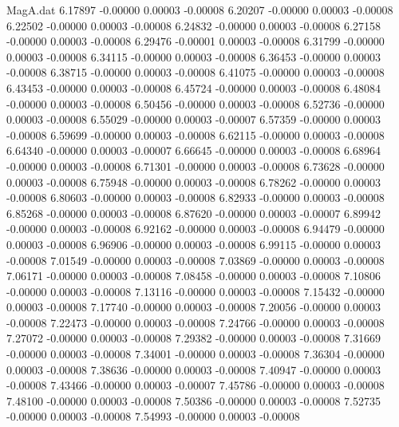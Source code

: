 \begin{filecontents}{MagA.dat}
   6.17897   -0.00000    0.00003   -0.00008
   6.20207   -0.00000    0.00003   -0.00008
   6.22502   -0.00000    0.00003   -0.00008
   6.24832   -0.00000    0.00003   -0.00008
   6.27158   -0.00000    0.00003   -0.00008
   6.29476   -0.00001    0.00003   -0.00008
   6.31799   -0.00000    0.00003   -0.00008
   6.34115   -0.00000    0.00003   -0.00008
   6.36453   -0.00000    0.00003   -0.00008
   6.38715   -0.00000    0.00003   -0.00008
   6.41075   -0.00000    0.00003   -0.00008
   6.43453   -0.00000    0.00003   -0.00008
   6.45724   -0.00000    0.00003   -0.00008
   6.48084   -0.00000    0.00003   -0.00008
   6.50456   -0.00000    0.00003   -0.00008
   6.52736   -0.00000    0.00003   -0.00008
   6.55029   -0.00000    0.00003   -0.00007
   6.57359   -0.00000    0.00003   -0.00008
   6.59699   -0.00000    0.00003   -0.00008
   6.62115   -0.00000    0.00003   -0.00008
   6.64340   -0.00000    0.00003   -0.00007
   6.66645   -0.00000    0.00003   -0.00008
   6.68964   -0.00000    0.00003   -0.00008
   6.71301   -0.00000    0.00003   -0.00008
   6.73628   -0.00000    0.00003   -0.00008
   6.75948   -0.00000    0.00003   -0.00008
   6.78262   -0.00000    0.00003   -0.00008
   6.80603   -0.00000    0.00003   -0.00008
   6.82933   -0.00000    0.00003   -0.00008
   6.85268   -0.00000    0.00003   -0.00008
   6.87620   -0.00000    0.00003   -0.00007
   6.89942   -0.00000    0.00003   -0.00008
   6.92162   -0.00000    0.00003   -0.00008
   6.94479   -0.00000    0.00003   -0.00008
   6.96906   -0.00000    0.00003   -0.00008
   6.99115   -0.00000    0.00003   -0.00008
   7.01549   -0.00000    0.00003   -0.00008
   7.03869   -0.00000    0.00003   -0.00008
   7.06171   -0.00000    0.00003   -0.00008
   7.08458   -0.00000    0.00003   -0.00008
   7.10806   -0.00000    0.00003   -0.00008
   7.13116   -0.00000    0.00003   -0.00008
   7.15432   -0.00000    0.00003   -0.00008
   7.17740   -0.00000    0.00003   -0.00008
   7.20056   -0.00000    0.00003   -0.00008
   7.22473   -0.00000    0.00003   -0.00008
   7.24766   -0.00000    0.00003   -0.00008
   7.27072   -0.00000    0.00003   -0.00008
   7.29382   -0.00000    0.00003   -0.00008
   7.31669   -0.00000    0.00003   -0.00008
   7.34001   -0.00000    0.00003   -0.00008
   7.36304   -0.00000    0.00003   -0.00008
   7.38636   -0.00000    0.00003   -0.00008
   7.40947   -0.00000    0.00003   -0.00008
   7.43466   -0.00000    0.00003   -0.00007
   7.45786   -0.00000    0.00003   -0.00008
   7.48100   -0.00000    0.00003   -0.00008
   7.50386   -0.00000    0.00003   -0.00008
   7.52735   -0.00000    0.00003   -0.00008
   7.54993   -0.00000    0.00003   -0.00008

\end{filecontents}
